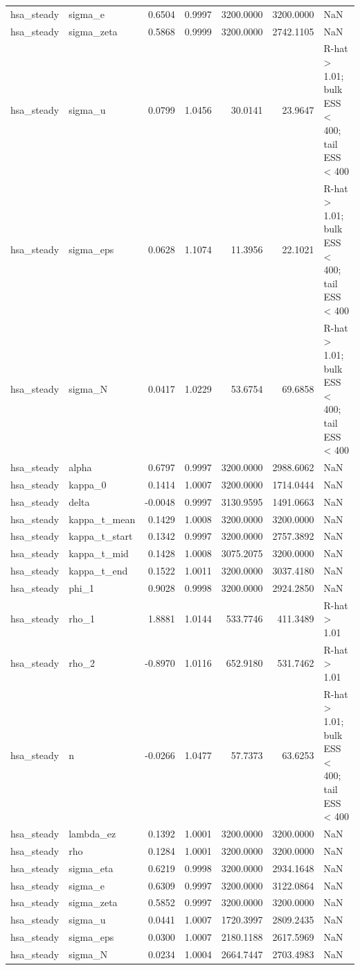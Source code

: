 \begin{tabular}{llrrrrl}
hsa\_steady & sigma\_e & 0.6504 & 0.9997 & 3200.0000 & 3200.0000 & NaN \\
hsa\_steady & sigma\_zeta & 0.5868 & 0.9999 & 3200.0000 & 2742.1105 & NaN \\
hsa\_steady & sigma\_u & 0.0799 & 1.0456 & 30.0141 & 23.9647 & R-hat > 1.01; bulk ESS < 400; tail ESS < 400 \\
hsa\_steady & sigma\_eps & 0.0628 & 1.1074 & 11.3956 & 22.1021 & R-hat > 1.01; bulk ESS < 400; tail ESS < 400 \\
hsa\_steady & sigma\_N & 0.0417 & 1.0229 & 53.6754 & 69.6858 & R-hat > 1.01; bulk ESS < 400; tail ESS < 400 \\
hsa\_steady & alpha & 0.6797 & 0.9997 & 3200.0000 & 2988.6062 & NaN \\
hsa\_steady & kappa\_0 & 0.1414 & 1.0007 & 3200.0000 & 1714.0444 & NaN \\
hsa\_steady & delta & -0.0048 & 0.9997 & 3130.9595 & 1491.0663 & NaN \\
hsa\_steady & kappa\_t\_mean & 0.1429 & 1.0008 & 3200.0000 & 3200.0000 & NaN \\
hsa\_steady & kappa\_t\_start & 0.1342 & 0.9997 & 3200.0000 & 2757.3892 & NaN \\
hsa\_steady & kappa\_t\_mid & 0.1428 & 1.0008 & 3075.2075 & 3200.0000 & NaN \\
hsa\_steady & kappa\_t\_end & 0.1522 & 1.0011 & 3200.0000 & 3037.4180 & NaN \\
hsa\_steady & phi\_1 & 0.9028 & 0.9998 & 3200.0000 & 2924.2850 & NaN \\
hsa\_steady & rho\_1 & 1.8881 & 1.0144 & 533.7746 & 411.3489 & R-hat > 1.01 \\
hsa\_steady & rho\_2 & -0.8970 & 1.0116 & 652.9180 & 531.7462 & R-hat > 1.01 \\
hsa\_steady & n & -0.0266 & 1.0477 & 57.7373 & 63.6253 & R-hat > 1.01; bulk ESS < 400; tail ESS < 400 \\
hsa\_steady & lambda\_ez & 0.1392 & 1.0001 & 3200.0000 & 3200.0000 & NaN \\
hsa\_steady & rho & 0.1284 & 1.0001 & 3200.0000 & 3200.0000 & NaN \\
hsa\_steady & sigma\_eta & 0.6219 & 0.9998 & 3200.0000 & 2934.1648 & NaN \\
hsa\_steady & sigma\_e & 0.6309 & 0.9997 & 3200.0000 & 3122.0864 & NaN \\
hsa\_steady & sigma\_zeta & 0.5852 & 0.9997 & 3200.0000 & 3200.0000 & NaN \\
hsa\_steady & sigma\_u & 0.0441 & 1.0007 & 1720.3997 & 2809.2435 & NaN \\
hsa\_steady & sigma\_eps & 0.0300 & 1.0007 & 2180.1188 & 2617.5969 & NaN \\
hsa\_steady & sigma\_N & 0.0234 & 1.0004 & 2664.7447 & 2703.4983 & NaN \\
\bottomrule
\end{tabular}
